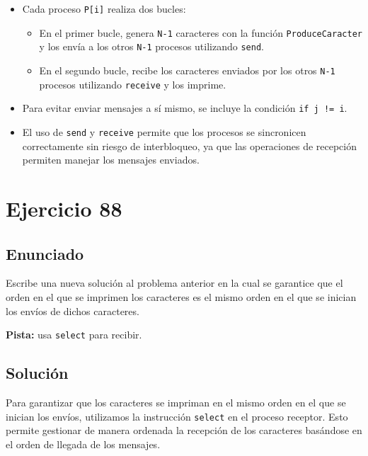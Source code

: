 \documentclass[a4paper,12pt]{article}
\begin{document}
\begin{itemize}
\begin{itemize}
    \item Cada proceso \texttt{P[i]} realiza dos bucles:
    \begin{itemize}
        \item En el primer bucle, genera \texttt{N-1} caracteres con la función \texttt{ProduceCaracter} y los envía a los otros \texttt{N-1} procesos utilizando \texttt{send}.
        \item En el segundo bucle, recibe los caracteres enviados por los otros \texttt{N-1} procesos utilizando \texttt{receive} y los imprime.
    \end{itemize}
    \item Para evitar enviar mensajes a sí mismo, se incluye la condición \texttt{if j != i}.
    \item El uso de \texttt{send} y \texttt{receive} permite que los procesos se sincronicen correctamente sin riesgo de interbloqueo, ya que las operaciones de recepción permiten manejar los mensajes enviados.
\end{itemize}

\end{itemize}






\section{Ejercicio 88}

\subsection{Enunciado}

Escribe una nueva solución al problema anterior en la cual se garantice que el orden en el que se imprimen los caracteres es el mismo orden en el que se inician los envíos de dichos caracteres. 

\textbf{Pista:} usa \texttt{select} para recibir.

\subsection{Solución}

Para garantizar que los caracteres se impriman en el mismo orden en el que se inician los envíos, utilizamos la instrucción \texttt{select} en el proceso receptor. Esto permite gestionar de manera ordenada la recepción de los caracteres basándose en el orden de llegada de los mensajes.
\end{document}

